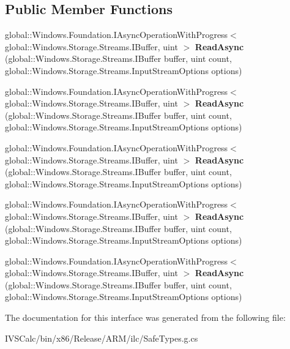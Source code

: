 \subsection*{Public Member Functions}
\begin{DoxyCompactItemize}
\item 
\mbox{\label{interface_windows_1_1_storage_1_1_streams_1_1_i_input_stream_a6bfeb9e35f3320397c292a3898adf3a8}} 
global\+::\+Windows.\+Foundation.\+I\+Async\+Operation\+With\+Progress$<$ global\+::\+Windows.\+Storage.\+Streams.\+I\+Buffer, uint $>$ {\bfseries Read\+Async} (global\+::\+Windows.\+Storage.\+Streams.\+I\+Buffer buffer, uint count, global\+::\+Windows.\+Storage.\+Streams.\+Input\+Stream\+Options options)
\item 
\mbox{\label{interface_windows_1_1_storage_1_1_streams_1_1_i_input_stream_a6bfeb9e35f3320397c292a3898adf3a8}} 
global\+::\+Windows.\+Foundation.\+I\+Async\+Operation\+With\+Progress$<$ global\+::\+Windows.\+Storage.\+Streams.\+I\+Buffer, uint $>$ {\bfseries Read\+Async} (global\+::\+Windows.\+Storage.\+Streams.\+I\+Buffer buffer, uint count, global\+::\+Windows.\+Storage.\+Streams.\+Input\+Stream\+Options options)
\item 
\mbox{\label{interface_windows_1_1_storage_1_1_streams_1_1_i_input_stream_a6bfeb9e35f3320397c292a3898adf3a8}} 
global\+::\+Windows.\+Foundation.\+I\+Async\+Operation\+With\+Progress$<$ global\+::\+Windows.\+Storage.\+Streams.\+I\+Buffer, uint $>$ {\bfseries Read\+Async} (global\+::\+Windows.\+Storage.\+Streams.\+I\+Buffer buffer, uint count, global\+::\+Windows.\+Storage.\+Streams.\+Input\+Stream\+Options options)
\item 
\mbox{\label{interface_windows_1_1_storage_1_1_streams_1_1_i_input_stream_a6bfeb9e35f3320397c292a3898adf3a8}} 
global\+::\+Windows.\+Foundation.\+I\+Async\+Operation\+With\+Progress$<$ global\+::\+Windows.\+Storage.\+Streams.\+I\+Buffer, uint $>$ {\bfseries Read\+Async} (global\+::\+Windows.\+Storage.\+Streams.\+I\+Buffer buffer, uint count, global\+::\+Windows.\+Storage.\+Streams.\+Input\+Stream\+Options options)
\item 
\mbox{\label{interface_windows_1_1_storage_1_1_streams_1_1_i_input_stream_a6bfeb9e35f3320397c292a3898adf3a8}} 
global\+::\+Windows.\+Foundation.\+I\+Async\+Operation\+With\+Progress$<$ global\+::\+Windows.\+Storage.\+Streams.\+I\+Buffer, uint $>$ {\bfseries Read\+Async} (global\+::\+Windows.\+Storage.\+Streams.\+I\+Buffer buffer, uint count, global\+::\+Windows.\+Storage.\+Streams.\+Input\+Stream\+Options options)
\end{DoxyCompactItemize}


The documentation for this interface was generated from the following file\+:\begin{DoxyCompactItemize}
\item 
I\+V\+S\+Calc/bin/x86/\+Release/\+A\+R\+M/ilc/Safe\+Types.\+g.\+cs\end{DoxyCompactItemize}
